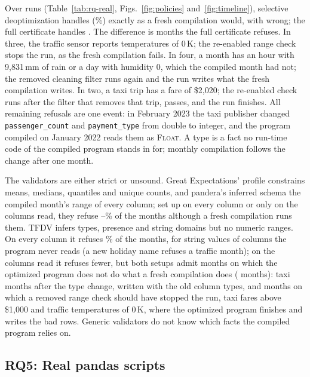 Over \RealRuns{} runs (Table~\ref{tab:rq-real}, Figs.~\ref{fig:policies} and~\ref{fig:timeline}), selective deoptimization
handles \RealDeoptCorrect{} (\RealDeoptCorrectPct\%) exactly as a fresh compilation would, with
\RealDeoptUnsound{} wrong; the full certificate handles \RealFullCorrect{}. The difference is
\RealRescued{} months the full certificate refuses. In three, the traffic sensor reports temperatures
of 0\,K; the re-enabled range check stops the run, as the fresh compilation fails. In four, a month has
an hour with 9,831\,mm of rain or a day with humidity 0, which the compiled month had not; the removed
cleaning filter runs again and the run writes what the fresh compilation writes. In two, a taxi trip
has a fare of \$2,020; the re-enabled check runs after the filter that removes that trip, passes, and
the run finishes. All \RealDeoptNeedless{} remaining refusals are one event: in February 2023 the
taxi publisher changed \texttt{passenger\_count} and \texttt{payment\_type} from double to integer,
and the program compiled on January 2022 reads them as \textsc{Float}. A type is a fact no run-time
code of the compiled program stands in for; monthly compilation follows the change after one month.

The validators are either strict or unsound. Great Expectations' profile constrains means, medians,
quantiles and unique counts, and pandera's inferred schema the compiled month's range of every
column; set up on every column or only on the columns read, they refuse
\RealValidatorStopMin--\RealValidatorStopMax\% of the months although a fresh compilation runs them.
TFDV infers types, presence and string domains but no numeric ranges. On every column it refuses
\RealTfdvAllNeedlessPct\% of the months, for string values of columns the program never reads (a new
holiday name refuses a traffic month); on the columns read it refuses fewer, but both setups admit
months on which the optimized program does not do what a fresh compilation does
(\RealTfdvReadUnsound{} months): taxi months after the type change, written with the old column types,
and months on which a removed range check should have stopped the run, taxi fares above \$1,000 and
traffic temperatures of 0\,K, where the optimized program finishes and writes the bad rows. Generic
validators do not know which facts the compiled program relies on.

\subsection{RQ5: Real pandas scripts}\label{sec:rq-corpus}

